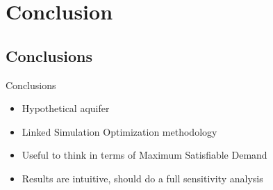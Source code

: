 \documentclass[xcolor=x11names,compress]{beamer}
\renewcommand{\(}{\begin{columns}}
\renewcommand{\)}{\end{columns}}
\newcommand{\<}[1]{\begin{column}{#1}}
\renewcommand{\>}{\end{column}}
\begin{document}
\section{Conclusion}
\subsection{Conclusions}
\begin{frame}{Conclusions}

\begin{itemize}
	\item Hypothetical aquifer
	\pause
	\item Linked Simulation Optimization methodology
	\pause
	\item Useful to think in terms of Maximum Satisfiable Demand
	\pause
	\item Results are intuitive, should do a full sensitivity analysis
\end{itemize} 

\end{frame}
\end{document}
